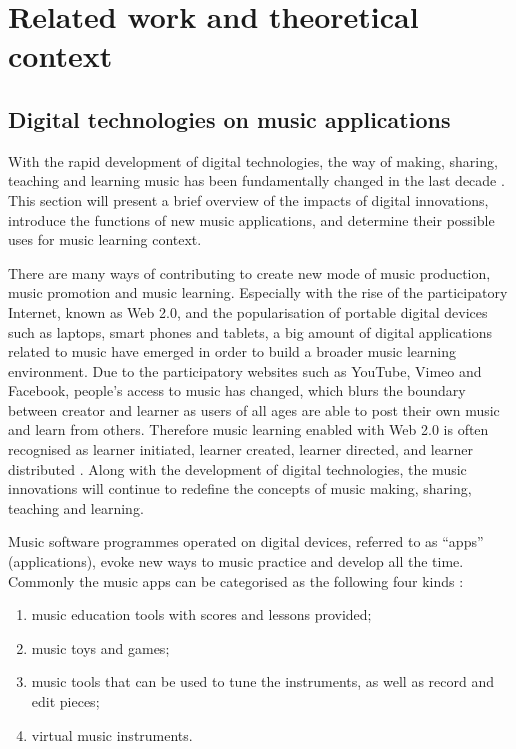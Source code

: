 
\chapter{Related work and theoretical context}

\section{Digital technologies on music applications}

With the rapid development of digital technologies, the way of making, sharing, teaching and learning music has been fundamentally changed in the last decade \cite{gouzouasis2011future}. This section will present a brief overview of the impacts of digital innovations, introduce the functions of new music applications, and determine their possible uses for music learning context.

There are many ways of contributing to create new mode of music production, music promotion and music learning. Especially with the rise of the participatory Internet, known as Web 2.0, and the popularisation of portable digital devices such as laptops, smart phones and tablets, a big amount of digital applications related to music have emerged in order to build a broader music learning  environment. Due to the participatory websites such as YouTube, Vimeo and Facebook, people's access to music has changed, which blurs the boundary between creator and learner as users of all ages are able to post their own music and learn from others. Therefore music learning enabled with Web 2.0 is often recognised as learner initiated, learner created, learner directed, and learner distributed \cite{london2011unlocking}. Along with the development of digital technologies, the music innovations will continue to redefine the concepts of music making, sharing, teaching and learning.

Music software programmes operated on digital devices, referred to as \enquote{apps} (applications), evoke new ways to music practice and develop all the time. Commonly the music apps can be categorised as the following four kinds \cite{gouzouasis2011future}:
\begin{enumerate}
\item music education tools with scores and lessons provided;
\item music toys and games;
\item music tools that can be used to tune the instruments, as well as record and edit pieces;
\item virtual music instruments.
\end{enumerate}


